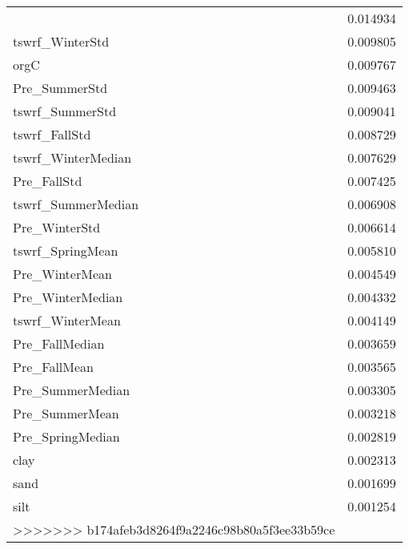 \begin{tabular}{lr}
\begin{tabular}{rrrrr}
Pre_SpringStd & 0.014934 \\
tswrf_WinterStd & 0.009805 \\
orgC & 0.009767 \\
Pre_SummerStd & 0.009463 \\
tswrf_SummerStd & 0.009041 \\
tswrf_FallStd & 0.008729 \\
tswrf_WinterMedian & 0.007629 \\
Pre_FallStd & 0.007425 \\
tswrf_SummerMedian & 0.006908 \\
Pre_WinterStd & 0.006614 \\
tswrf_SpringMean & 0.005810 \\
Pre_WinterMean & 0.004549 \\
Pre_WinterMedian & 0.004332 \\
tswrf_WinterMean & 0.004149 \\
Pre_FallMedian & 0.003659 \\
Pre_FallMean & 0.003565 \\
Pre_SummerMedian & 0.003305 \\
Pre_SummerMean & 0.003218 \\
Pre_SpringMedian & 0.002819 \\
clay & 0.002313 \\
sand & 0.001699 \\
silt & 0.001254 \\
>>>>>>> b174afeb3d8264f9a2246c98b80a5f3ee33b59ce
\bottomrule
\end{tabular}
